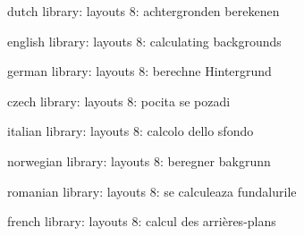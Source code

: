 

\unprotect

\startmessages  dutch  library: layouts
      8: achtergronden berekenen
\stopmessages

\startmessages  english  library: layouts
      8: calculating backgrounds
\stopmessages

\startmessages  german  library: layouts
      8: berechne Hintergrund
\stopmessages

\startmessages  czech  library: layouts
      8: pocita se pozadi
\stopmessages

\startmessages  italian  library: layouts
      8: calcolo dello sfondo
\stopmessages

\startmessages  norwegian  library: layouts
      8: beregner bakgrunn
\stopmessages

\startmessages  romanian  library: layouts
      8: se calculeaza fundalurile
\stopmessages

\startmessages  french  library: layouts
      8: calcul des arrières-plans
\stopmessages


\newif\ifnewbackground
\newif\ifsomebackground


\appendtoks
  \ifsomebackground \ifnewbackground \setsystemmode\v!background \fi \fi
\to \everybeforepagebody


